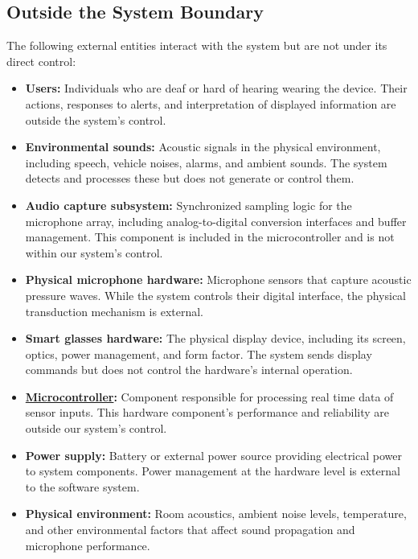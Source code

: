 \documentclass{article}
\begin{document}
\subsection{Outside the System Boundary}

The following external entities interact with the system but are not under
its direct control:

\begin{itemize}
\item \textbf{Users:} Individuals who are deaf or hard of hearing wearing
the device. Their actions, responses to alerts, and interpretation of
displayed information are outside the system's control.

\item \textbf{Environmental sounds:} Acoustic signals in the physical
environment, including speech, vehicle noises, alarms, and ambient sounds.
The system detects and processes these but does not generate or control
them.

\item \textbf{Audio capture subsystem:} Synchronized sampling logic for the
microphone array, including analog-to-digital conversion interfaces and
buffer management. This component is included in the microcontroller and is not
within our system's control.

\item \textbf{Physical microphone hardware:} Microphone sensors that capture
acoustic pressure waves. While the system controls their digital interface,
the physical transduction mechanism is external.

\item \textbf{Smart glasses hardware:} The physical display device,
including its screen, optics, power management, and form factor. The system
sends display commands but does not control the hardware's internal
operation.

\item \textbf{\href{def:microcontroller}{Microcontroller}:}
\label{comp:microcontroller} Component responsible for processing real time
data of sensor inputs. This hardware component's performance and reliability
are outside our system's control.

\item \textbf{Power supply:} Battery or external power source providing
electrical power to system components. Power management at the hardware
level is external to the software system.

\item \textbf{Physical environment:} Room acoustics, ambient noise levels,
temperature, and other environmental factors that affect sound propagation
and microphone performance.
\end{itemize}
\end{document}
